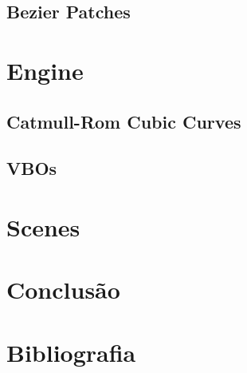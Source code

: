 \documentclass[a4paper]{article}
\begin{document}
\subsection{Bezier Patches}
\label{sec:bezier}



\section{Engine}
\label{sec:engine}

\subsection{Catmull-Rom Cubic Curves}
\label{sec:catmullrom}


\subsection{VBOs}
\label{sec:vbos}



\section{Scenes}
\label{sec:scenes}


\section{Conclusão}
\label{sec:conclusao}


\section{Bibliografia}
\label{sec:bibliografia}
\end{document}
